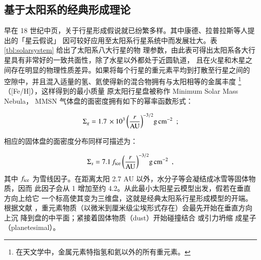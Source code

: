 \subsection{基于太阳系的经典形成理论} \label{sec:clspftheory}

早在 18 世纪中页，关于行星形成假说就已纷繁多样。其中康德、拉普拉斯等人提出的「星云假说」
因可较好应用至太阳系行星系统中而发展壮大。表\ref{tbl:solarsystem} 给出了太阳系八大行星的物
理参数，由此表可得出太阳系各大行星具有非常好的一致共面性，除了水星以外都处于近圆轨道，
且在火星和木星之间存在明显的物理性质差异。如果将每个行星的重元素平均到打散至行星之间的
空隙中，并且混入适量的氢、氦使得新的混合物拥有与太阳相等的金属丰度
\footnote{在天文学中，金属元素特指氢和氦以外的所有重元素。}（[Fe/H]），这样得到的最小质量
原太阳行星盘被称作 Minimum Solar Mass Nebula\cite{Weidenschilling1977,Hayashi1981}，
MMSN 气体盘的面密度拥有如下的幂率函数形式：

\begin{equation} \label{eq:mmsng}
\Sigma_g = 1.7 \,\times10^3 \, \bigg(\frac{r}{\tif{AU}}\bigg)^{-3/2}  \tif{g} \,\tif{cm}^{-2} \ \ ; 
\end{equation} %

相应的固体盘的面密度分布同样可描述为：

\begin{equation} \label{eq:mmsns}
\Sigma_s = 7.1 \, f_\tif{ice} \, \bigg(\frac{r}{\tif{AU}}\bigg)^{-3/2}  \tif{g} \,\tif{cm}^{-2} \ \ ,
\end{equation} %
其中 $f_\mathrm{ice}$ 为雪线因子。在距离太阳 2.7 AU 以外，水分子等会凝结成冰雪等固体物质，因而
此因子会从 1 增加至约 4.2\cite{IdaLin2004}。从此最小太阳星云模型出发，假若在垂直方向上给它
一个标高使其变为三维盘，这就是经典太阳系行星形成模型的开端。根据文献 
，重元素物质（以微米到厘米级尘埃形式存在）会最先开始在垂直方向上沉
降到盘的中平面；紧接着固体物质（dust）开始碰撞结合
\cite{ppvibook2014,Weidenschilling1997,BlumWurm2008}或引力坍缩
\cite{Safronov1972,GoldreichWard1973,YoudinShu2002,ChiangYoudin2010}成星子（planetesimal）。


